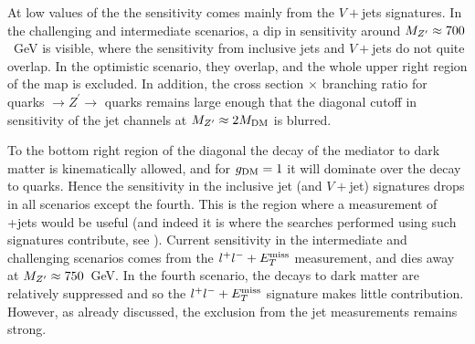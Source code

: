 \documentclass[floatfix]{article}
\begin{document}
At low values of the \MZP the sensitivity comes mainly from the $V+$jets signatures. In the challenging and intermediate scenarios, a dip in sensitivity around 
$M_{Z^{\prime}} \approx 700$~GeV is visible, where the sensitivity from inclusive jets and $V+$jets do not quite overlap. In the optimistic scenario, they overlap, and the whole upper
right  region of the map is excluded. In addition, the cross section $\times$ branching ratio for quarks $\rightarrow Z^\prime \rightarrow$ quarks remains large
enough that the diagonal cutoff in sensitivity of the jet channels at $M_{Z^{\prime}} \approx 2M_{\rm DM}$ is blurred. 

To the bottom right region of the diagonal the decay of the mediator to dark matter is kinematically allowed, and for $g_{\rm DM}=1$ it will dominate 
over the decay to quarks. Hence the sensitivity in the inclusive jet (and $V+$jet) signatures drops in all scenarios except the fourth. 
This is the region where a measurement of \MET+jets would be useful 
(and indeed it is where the searches performed using such signatures contribute, see \cite{Kahlhoefer:2015bea}). Current sensitivity in the intermediate and challenging scenarios 
comes from the $l^+l^- + E_T^{\rm miss}$ measurement, and dies away at $M_{Z^{\prime}} \approx 750$~GeV. In the fourth scenario, the decays to dark matter are relatively suppressed and 
so the $l^+l^- + E_T^{\rm miss}$ signature makes little contribution. However, as already discussed, the exclusion from the jet measurements remains strong.
\end{document}
